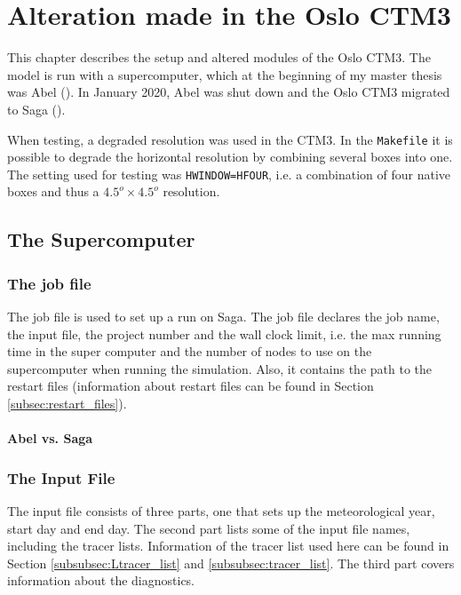 \setcounter{chapter}{4}
\chapter{Alteration made in the Oslo CTM3}

This chapter describes the setup and altered modules of the Oslo CTM3. The model is run with a supercomputer, which at the beginning of my master thesis was Abel (\cite{abel}). In January 2020, Abel was shut down and the Oslo CTM3 migrated to Saga (\cite{saga}). 

\medskip

When testing, a degraded resolution was used in the CTM3. In the \texttt{Makefile} it is possible to degrade the horizontal resolution by combining several boxes into one. The setting used for testing was \texttt{HWINDOW=HFOUR}, i.e. a combination of four native boxes and thus a $4.5^o \times 4.5^o$ resolution. 



\section{The Supercomputer}

\subsection{The job file}

The job file is used to set up a run on Saga. The job file declares the job name, the input file, the project number and the wall clock limit, i.e. the max running time in the super computer and the number of nodes to use on the supercomputer when running the simulation. Also, it contains the path to the restart files (information about restart files can be found in Section \ref{subsec:restart_files}).

\subsubsection{Abel vs. Saga}



\subsection{The Input File}

The input file consists of three parts, one that sets up the meteorological year, start day and end day. The second part lists some of the input file names, including the tracer lists. Information of the tracer list used here can be found in Section \ref{subsubsec:Ltracer_list} and \ref{subsubsec:tracer_list}. The third part covers information about the diagnostics. 



